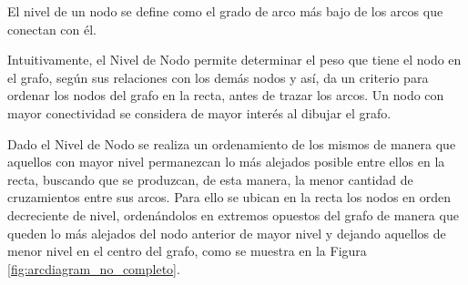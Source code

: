 	\begin{definition}
		El nivel de un nodo se define como el grado de arco más bajo de los arcos que conectan con él.
	\end{definition}
	
	
	Intuitivamente,  el Nivel de Nodo permite determinar el  peso que tiene el nodo en el grafo, según sus relaciones con los demás nodos y así, da un criterio para ordenar los nodos del grafo en la recta,  antes de trazar los arcos. Un nodo con mayor conectividad se considera de mayor interés al  dibujar el grafo. %
	
	Dado el Nivel de Nodo se realiza un ordenamiento de los mismos de manera que aquellos con mayor nivel permanezcan lo más alejados posible entre ellos en la recta, buscando que se produzcan, de esta manera, la menor cantidad de cruzamientos entre sus arcos. Para ello se ubican en la recta los nodos en orden decreciente de nivel, ordenándolos en extremos opuestos del grafo de manera que queden lo más alejados del nodo anterior de mayor nivel y dejando aquellos de menor nivel en el centro del grafo, como se muestra en la Figura \ref{fig:arcdiagram_no_completo}.
	
